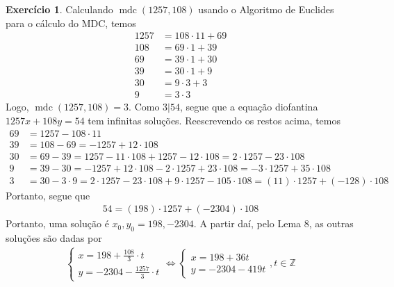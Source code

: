 \documentclass[a4paper,12pt]{article}
\DeclareMathOperator{\mdc}{mdc}
\theoremstyle{definition}
\newtheorem{exercise}{Exercício}%
\begin{document}
	\begin{exercise}
		Calculando $\mdc(1257, 108)$ usando o Algoritmo de Euclides para o cálculo do MDC, temos
		\begin{align*}
		1257 &= 108\cdot 11 + 69 \\
		108 &= 69\cdot 1 + 39 \\
		69 &= 39\cdot 1 + 30 \\
		39 &= 30\cdot 1 + 9 \\
		30 &= 9\cdot 3 + 3 \\
		9 &= 3\cdot 3 
		\end{align*}
		Logo, $\mdc(1257, 108) = 3$. Como $3|54$, segue que a equação diofantina $1257x + 108y = 54$ tem infinitas soluções. Reescrevendo os restos acima, temos
		\begin{align*}
		69 &= 1257 - 108\cdot 11 \\
		39 &= 108 - 69 = -1257 + 12\cdot 108 \\
		30 &= 69 - 39 = 1257 - 11\cdot 108 + 1257 - 12\cdot 108 = 2\cdot 1257 - 23\cdot 108 \\
		9 &= 39 - 30 = -1257 + 12\cdot 108 - 2\cdot 1257 + 23\cdot 108 = -3\cdot 1257 + 35\cdot 108 \\
		3 &= 30 - 3\cdot 9 = 2\cdot 1257 - 23\cdot 108 + 9\cdot 1257 - 105\cdot 108 = (11)\cdot 1257 + (-128)\cdot 108
		\end{align*}
		Portanto, segue que
		\begin{align*}
		54 = (198)\cdot 1257 + (-2304)\cdot 108
		\end{align*}
		Portanto, uma solução é $x_0, y_0 = 198, -2304$. A partir daí, pelo Lema 8, as outras soluções são dadas por
		\begin{align*}
		\begin{cases}
		x = 198 + \displaystyle{\frac{108}{3}}\cdot t \\
		y = -2304 - \displaystyle{ \frac{1257}{3}}\cdot t
		\end{cases} \Leftrightarrow \begin{cases}
		x = 198 + 36t \\
		y = -2304 - 419t
		\end{cases}, t\in\mathbb{Z}
		\end{align*}		
	\end{exercise}
\end{document}
